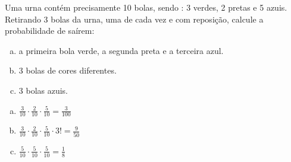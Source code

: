 \begin{ex}
Uma urna contém precisamente 10 bolas, sendo : 3 verdes, 2 pretas e 5 azuis. Retirando 3 bolas da urna, uma de cada vez e com reposição, calcule a probabilidade de saírem:
   \begin{enumerate}[(a)]
   \item a primeira bola verde, a segunda preta e a terceira azul.
   \item 3 bolas de cores diferentes.
   \item 3 bolas azuis.
   \end{enumerate}
    \begin{sol}
       \phantom{A}
       \begin{enumerate} [(a)]
           \item $\frac{3}{10}\cdot\frac{2}{10}\cdot\frac{5}{10}=\frac{3}{100}$
           \item $\frac{3}{10}\cdot\frac{2}{10}\cdot\frac{5}{10}\cdot3!=\frac{9}{50}$
           \item $\frac{5}{10}\cdot\frac{5}{10}\cdot\frac{5}{10}=\frac{1}{8}$
       \end{enumerate}
    \end{sol}
\end{ex}